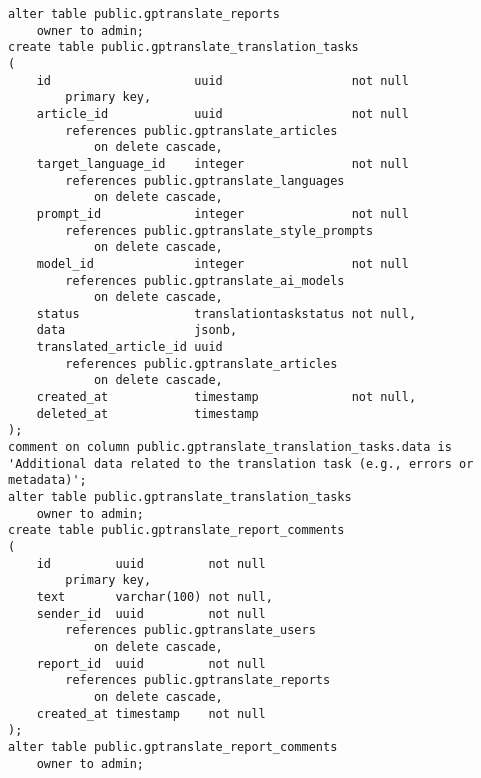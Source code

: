 \begin{lstlisting}
alter table public.gptranslate_reports
    owner to admin;
create table public.gptranslate_translation_tasks
(
    id                    uuid                  not null
        primary key,
    article_id            uuid                  not null
        references public.gptranslate_articles
            on delete cascade,
    target_language_id    integer               not null
        references public.gptranslate_languages
            on delete cascade,
    prompt_id             integer               not null
        references public.gptranslate_style_prompts
            on delete cascade,
    model_id              integer               not null
        references public.gptranslate_ai_models
            on delete cascade,
    status                translationtaskstatus not null,
    data                  jsonb,
    translated_article_id uuid
        references public.gptranslate_articles
            on delete cascade,
    created_at            timestamp             not null,
    deleted_at            timestamp
);
comment on column public.gptranslate_translation_tasks.data is 'Additional data related to the translation task (e.g., errors or metadata)';
alter table public.gptranslate_translation_tasks
    owner to admin;
create table public.gptranslate_report_comments
(
    id         uuid         not null
        primary key,
    text       varchar(100) not null,
    sender_id  uuid         not null
        references public.gptranslate_users
            on delete cascade,
    report_id  uuid         not null
        references public.gptranslate_reports
            on delete cascade,
    created_at timestamp    not null
);
alter table public.gptranslate_report_comments
    owner to admin;
\end{lstlisting}